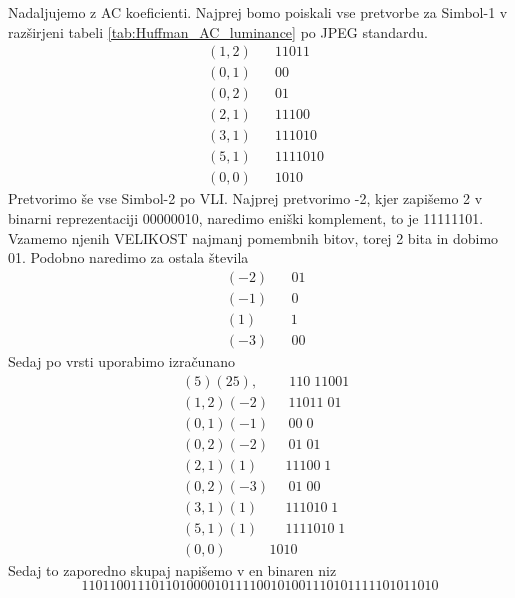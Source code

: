 \documentclass[a4paper,12pt,openright]{book}
\begin{document}
Nadaljujemo z AC koeficienti. Najprej bomo poiskali vse pretvorbe za Simbol-1 v razširjeni tabeli \ref{tab:Huffman_AC_luminance} po JPEG standardu. 
\begin{equation*}
  \begin{aligned}
    &(1,2)\;\;\;\;\;\;11011   \\
    &(0,1)\;\;\;\;\;\;00   \\
    &(0,2)\;\;\;\;\;\;01   \\
    &(2,1)\;\;\;\;\;\;11100   \\
    &(3,1)\;\;\;\;\;\;111010   \\
    &(5,1)\;\;\;\;\;\;1111010   \\
    &(0,0)\;\;\;\;\;\;1010 
  \end{aligned}
\end{equation*}
Pretvorimo še vse Simbol-2 po VLI. Najprej pretvorimo -2, kjer zapišemo 2 v binarni reprezentaciji 00000010, naredimo eniški komplement, to je 11111101. Vzamemo njenih VELIKOST najmanj pomembnih bitov, torej 2 bita in dobimo 01. Podobno naredimo za ostala števila
\begin{equation*}
  \begin{aligned}
    &(-2)\;\;\;\;\;\;01 \\
    &(-1)\;\;\;\;\;\;0 \\
    &(1) \;\;\;\;\;\;\;\;\,1 \\ 
    &(-3)\;\;\;\;\;\;00 
  \end{aligned}
\end{equation*}
Sedaj po vrsti uporabimo izračunano
\begin{equation*}
  \begin{aligned}
    &(5)(25), \;\;\;\;\;\;\;\;110\;11001\\
    &(1,2)(-2)\;\;\;\;\;11011\;01\\
    &(0,1)(-1)\;\;\;\;\;00\;0\\
    &(0,2)(-2)\;\;\;\;\;01\;01\\
    &(2,1)(1)\;\;\;\;\;\;\;11100\;1\\
    &(0,2)(-3)\;\;\;\;\;01\;00\\
    &(3,1)(1) \;\;\;\;\;\;\;111010\;1\\
    &(5,1)(1) \;\;\;\;\;\;\;1111010\;1\\
    &(0,0)     \;\;\;\;\;\;\;\;\;\;\;1010
  \end{aligned}
\end{equation*}
Sedaj to zaporedno skupaj napišemo v en binaren niz 
\begin{equation*}
110110011101101000010111100101001110101111101011010
\end{equation*}
\end{document}
